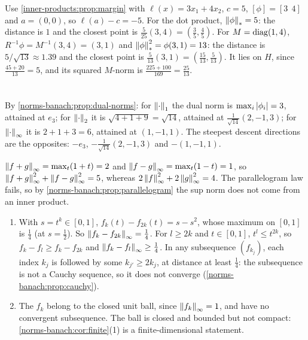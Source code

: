Use \cref{inner-products:prop:margin} with $\ell(x) = 3x_1 + 4x_2$,
$c = 5$, $[\phi] = [3\ \ 4]$ and $a = (0, 0)$, so $\ell(a) - c = -5$. For
the dot product, $\left\|\phi\right\|_* = 5$: the distance is $1$ and the closest
point is $\frac5{25}(3, 4) = (\frac35, \frac45)$. For $M = \operatorname{diag}(1, 4)$,
$R^{-1}\phi = M^{-1}(3, 4) = (3, 1)$ and
$\left\|\phi\right\|_*^2 = \phi(3, 1) = 13$: the distance is
$5/\sqrt{13}\approx1.39$ and the closest point is
$\frac5{13}(3, 1) = (\frac{15}{13}, \frac5{13})$. It lies on $H$, since
$\frac{45 + 20}{13} = 5$, and its squared $M$-norm is
$\frac{225 + 100}{169} = \frac{25}{13}$.

\section{}

By \cref{norms-banach:prop:dual-norms}: for $\left\|\cdot\right\|_1$ the dual norm
is $\max_i\left|\phi_i\right| = 3$, attained at $e_3$; for $\left\|\cdot\right\|_2$ it is
$\sqrt{4 + 1 + 9} = \sqrt{14}$, attained at $\frac1{\sqrt{14}}(2, -1, 3)$;
for $\left\|\cdot\right\|_\infty$ it is $2 + 1 + 3 = 6$, attained at $(1, -1, 1)$.
The steepest descent directions are the opposites: $-e_3$,
$-\frac1{\sqrt{14}}(2, -1, 3)$ and $-(1, -1, 1)$.

$\left\|f + g\right\|_\infty = \max_t(1 + t) = 2$ and
$\left\|f - g\right\|_\infty = \max_t(1 - t) = 1$, so
$\left\|f + g\right\|_\infty^2 + \left\|f - g\right\|_\infty^2 = 5$, whereas
$2\left\|f\right\|_\infty^2 + 2\left\|g\right\|_\infty^2 = 4$. The parallelogram law fails,
so by \cref{norms-banach:prop:parallelogram} the sup norm does not come
from an inner product.

\begin{enumerate}[nosep]
  \item With $s = t^k\in[0, 1]$, $f_k(t) - f_{2k}(t) = s - s^2$, whose
        maximum on $[0, 1]$ is $\frac14$ (at $s = \frac12$). So
        $\left\|f_k - f_{2k}\right\|_\infty = \frac14$. For $l\geq2k$ and
        $t\in[0, 1]$, $t^l\leq t^{2k}$, so
        $f_k - f_l\geq f_k - f_{2k}$ and
        $\left\|f_k - f_l\right\|_\infty\geq\frac14$. In any subsequence
        $(f_{k_j})$, each index $k_j$ is followed by some
        $k_{j'}\geq2k_j$, at distance at least $\frac14$: the subsequence
        is not a Cauchy sequence, so it does not converge
        (\cref{norms-banach:prop:cauchy}).
  \item The $f_k$ belong to the closed unit ball, since
        $\left\|f_k\right\|_\infty = 1$, and have no convergent subsequence. The
        ball is closed and bounded but not compact:
        \cref{norms-banach:cor:finite}(1) is a finite-dimensional
        statement.
\end{enumerate}

